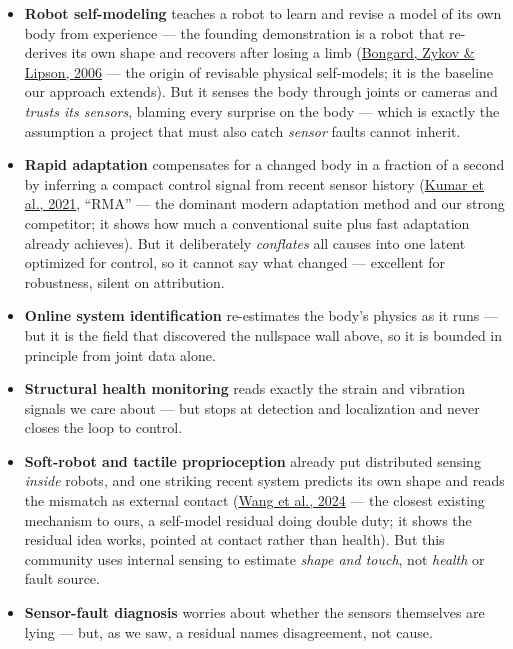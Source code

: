 \documentclass[12pt]{article}
\begin{document}
\begin{itemize}
  \item \textbf{Robot self-modeling} teaches a robot to learn and revise a model of its own body from experience --- the founding demonstration is a robot that re-derives its own shape and recovers after losing a limb (\href{https://doi.org/10.1126/science.1133687}{Bongard, Zykov \& Lipson, 2006} --- the origin of revisable physical self-models; it is the baseline our approach extends). But it senses the body through joints or cameras and \emph{trusts its sensors}, blaming every surprise on the body --- which is exactly the assumption a project that must also catch \emph{sensor} faults cannot inherit.
  \item \textbf{Rapid adaptation} compensates for a changed body in a fraction of a second by inferring a compact control signal from recent sensor history (\href{https://arxiv.org/abs/2107.04034}{Kumar et al., 2021}, ``RMA'' --- the dominant modern adaptation method and our strong competitor; it shows how much a conventional suite plus fast adaptation already achieves). But it deliberately \emph{conflates} all causes into one latent optimized for control, so it cannot say what changed --- excellent for robustness, silent on attribution.
  \item \textbf{Online system identification} re-estimates the body's physics as it runs --- but it is the field that discovered the nullspace wall above, so it is bounded in principle from joint data alone.
  \item \textbf{Structural health monitoring} reads exactly the strain and vibration signals we care about --- but stops at detection and localization and never closes the loop to control.
  \item \textbf{Soft-robot and tactile proprioception} already put distributed sensing \emph{inside} robots, and one striking recent system predicts its own shape and reads the mismatch as external contact (\href{https://doi.org/10.1038/s41467-024-54327-6}{Wang et al., 2024} --- the closest existing mechanism to ours, a self-model residual doing double duty; it shows the residual idea works, pointed at contact rather than health). But this community uses internal sensing to estimate \emph{shape and touch}, not \emph{health} or fault source.
  \item \textbf{Sensor-fault diagnosis} worries about whether the sensors themselves are lying --- but, as we saw, a residual names disagreement, not cause.
\end{itemize}
\end{document}

